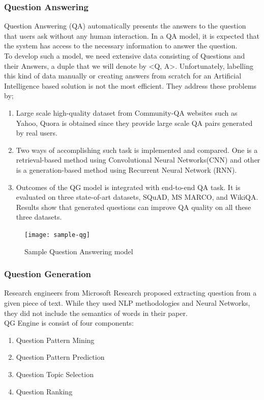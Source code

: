 \documentclass{mefsdp}
\begin{document}
	\subsubsection{Question Answering}
	Question Answering (QA) automatically presents the answers to the question that users ask without any human interaction. In a QA model, it is expected that the system has access to the necessary information to answer the question.\\
	To develop such a model, we need extensive data consisting of Questions and their Answers, a duple that we will denote by <Q, A>. Unfortunately, labelling this kind of data manually or creating answers from scratch for an Artificial Intelligence based solution is not the most efficient.
	They address these problems by;
	\begin{enumerate}
		\item Large scale high-quality dataset from Community-QA websites such as Yahoo, Quora is obtained since they provide large scale QA pairs generated by real users.
		\item Two ways of accomplishing such task is implemented and compared. One is a retrieval-based method using Convolutional Neural Networks(CNN) and other is a generation-based method using Recurrent Neural Network (RNN).
		\item Outcomes of the QG model is integrated with end-to-end QA task. It is evaluated on three state-of-art datasets, SQuAD, MS MARCO, and WikiQA. Results show that generated questions can improve QA quality on all these three datasets.
	\end{enumerate}
	
	\begin{figure}[ht!]
		\centering
		\texttt{[image: sample-qg]}
		\caption{Sample Question Answering model}
	\end{figure}
	
	\subsubsection{Question Generation}
	Research engineers from Microsoft Research proposed extracting question from a given piece of text. \cite{duan2017question} While they used NLP methodologies and Neural Networks, they did not include the semantics of words in their paper.\\
	
	QG Engine is consist of four components:
	\begin{enumerate}
		\item Question Pattern Mining
		\item Question Pattern Prediction
		\item Question Topic Selection
		\item Question Ranking
	\end{enumerate}
\end{document}
